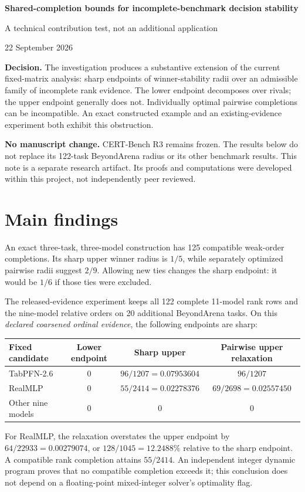 \documentclass[11pt,a4paper]{article}
\begin{document}
\begin{center}
{\LARGE\bfseries Shared-completion bounds for incomplete-benchmark decision stability}\par
\vspace{5pt}
{\large A technical contribution test, not an additional application}\par
22 September 2026\par
\end{center}

\textbf{Decision.} The investigation produces a substantive extension of the current
fixed-matrix analysis: sharp endpoints of winner-stability radii over an admissible
family of incomplete rank evidence. The lower endpoint decomposes over rivals;
the upper endpoint generally does not. Individually optimal pairwise completions
can be incompatible. An exact constructed example and an existing-evidence
experiment both exhibit this obstruction.

\textbf{No manuscript change.} CERT-Bench R3 remains frozen. The results below do
not replace its 122-task BeyondArena radius or its other benchmark results. This
note is a separate research artifact. Its proofs and computations were developed
within this project, not independently peer reviewed.

\section*{Main findings}
An exact three-task, three-model construction has 125 compatible weak-order
completions. Its sharp upper winner radius is $1/5$, while separately optimized
pairwise radii suggest $2/9$. Allowing new ties changes the sharp endpoint: it
would be $1/6$ if those ties were excluded.

The released-evidence experiment keeps all 122 complete 11-model rank rows and
the nine-model relative orders on 20 additional BeyondArena tasks. On this
\emph{declared coarsened ordinal evidence}, the following endpoints are sharp:
\begin{center}
\begin{tabular}{lccc}\toprule
Fixed candidate & Lower endpoint & Sharp upper & Pairwise upper relaxation\\\midrule
TabPFN-2.6 & $0$ & $96/1207=0.07953604$ & $96/1207$\\
RealMLP & $0$ & $55/2414=0.02278376$ & $69/2698=0.02557450$\\
Other nine models & $0$ & $0$ & $0$\\\bottomrule
\end{tabular}
\end{center}
For RealMLP, the relaxation overstates the upper endpoint by
$64/22933=0.00279074$, or $128/1045=12.2488\%$ relative to the sharp endpoint.
A compatible rank completion attains $55/2414$. An independent integer dynamic
program proves that no compatible completion exceeds it; this conclusion does
not depend on a floating-point mixed-integer solver's optimality flag.
\end{document}
